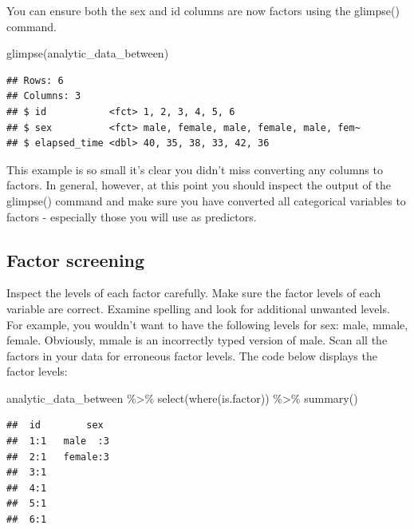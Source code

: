 \documentclass[
]{krantz}
\makeatletter
\newenvironment{Shaded}{\begin{snugshade}}{\end{snugshade}}
\newcommand{\FunctionTok}[1]{\textcolor[rgb]{0,0,0}{#1}}
\newcommand{\NormalTok}[1]{#1}
\newcommand{\SpecialCharTok}[1]{\textcolor[rgb]{0,0,0}{#1}}
\newenvironment{kframe}{%
\medskip{}
\setlength{\fboxsep}{.8em}
 \def\at@end@of@kframe{}%
 \ifinner\ifhmode%
  \def\at@end@of@kframe{\end{minipage}}%
  \begin{minipage}{\columnwidth}%
 \fi\fi%
 \def\FrameCommand##1{\hskip\@totalleftmargin \hskip-\fboxsep
 \colorbox{shadecolor}{##1}\hskip-\fboxsep
     \hskip-\linewidth \hskip-\@totalleftmargin \hskip\columnwidth}%
 \MakeFramed {\advance\hsize-\width
   \@totalleftmargin\z@ \linewidth\hsize
   \@setminipage}}%
 {\par\unskip\endMakeFramed%
 \at@end@of@kframe}
\renewenvironment{Shaded}{\begin{kframe}}{\end{kframe}}
\makeatother
\begin{document}
You can ensure both the sex and id columns are now factors using the glimpse() command.

\begin{Shaded}
\begin{Highlighting}[]
\FunctionTok{glimpse}\NormalTok{(analytic\_data\_between)}
\end{Highlighting}
\end{Shaded}

\begin{verbatim}
## Rows: 6
## Columns: 3
## $ id           <fct> 1, 2, 3, 4, 5, 6
## $ sex          <fct> male, female, male, female, male, fem~
## $ elapsed_time <dbl> 40, 35, 38, 33, 42, 36
\end{verbatim}

This example is so small it's clear you didn't miss converting any columns to factors. In general, however, at this point you should inspect the output of the glimpse() command and make sure you have converted all categorical variables to factors - especially those you will use as predictors.

\hypertarget{factor-screening}{%
\subsection{Factor screening}\label{factor-screening}}

Inspect the levels of each factor carefully. Make sure the factor levels of each variable are correct. Examine spelling and look for additional unwanted levels. For example, you wouldn't want to have the following levels for sex: male, mmale, female. Obviously, mmale is an incorrectly typed version of male. Scan all the factors in your data for erroneous factor levels. The code below displays the factor levels:

\begin{Shaded}
\begin{Highlighting}[]
\NormalTok{analytic\_data\_between }\SpecialCharTok{\%\textgreater{}\%}
  \FunctionTok{select}\NormalTok{(}\FunctionTok{where}\NormalTok{(is.factor)) }\SpecialCharTok{\%\textgreater{}\%}
  \FunctionTok{summary}\NormalTok{()}
\end{Highlighting}
\end{Shaded}

\begin{verbatim}
##  id        sex   
##  1:1   male  :3  
##  2:1   female:3  
##  3:1             
##  4:1             
##  5:1             
##  6:1
\end{verbatim}
\end{document}

